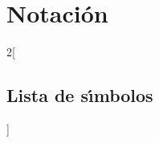
\ifenglish
  \def\notationname{Notation}
  \def\notationsymb{Symbol}
  \def\notationdesc{Description}
  \def\notationlist{List of Symbols}
\else
  \def\notationname{Notaci\'on}
  \def\notationsymb{S\'\i mbolo}
  \def\notationdesc{Descripci\'on}
  \def\notationlist{Lista de s\'\i mbolos}
\fi

\chapter{\notationname}
\label{appendix:notation}

\setlength{\columnseprule}{0.2pt}

\begin{multicols}{2}[\section{\notationlist}]
  
  {\footnotesize
    
    \begin{list}{}{%
        \setlength{\itemsep}{0pt}%
        \setlength{\labelwidth}{50pt}%
        \setlength{\leftmargin}{\labelwidth+\labelsep}}
      
      
      
      
    \end{list}
    
    }
  
\end{multicols}




%


\endinput
%

